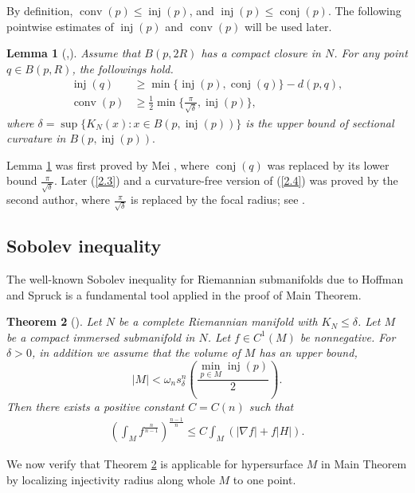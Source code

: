 \documentclass{amsart}
\numberwithin{equation}{section}
\newtheorem{theo}{Theorem}[section]
\newtheorem{lem}[theo]{Lemma}
\theoremstyle{remark}
\renewcommand{\(}{\left(}
\renewcommand{\)}{\right)}
\renewcommand{\~}{\tilde}
\renewcommand{\-}{\overline}
\renewcommand{\d}{\delta}
\newcommand{\inj}{\operatorname{inj}}
\newcommand{\conj}{\operatorname{conj}}
\newcommand{\conv}{\operatorname{conv}}
\begin{document}
By definition, $\conv(p)\le \inj(p)$, and  $\inj(p)\le \conj(p)$. The following pointwise estimates of $\inj(p)$ and $\conv(p)$ will be used later.

\begin{lem}[\cite{Xu2018},\cite{Mei2016}]\label{theo-2.2}
	Assume that $B(p,2R)$ has a compact closure in $N$. For any point $q\in B(p,R)$, the followings hold.
	\begin{align}\label{2.3}
	\inj(q)&\geq \min\{\inj(p),\conj(q)\}-d(p,q),\\
	\label{2.4}
	\conv(p)&\geq \frac{1}{2}\min\{\frac{\pi}{\sqrt{\d}},\inj(p)\},
	\end{align}
	where $\d=\sup\{K_N(x): x\in B(p,\inj(p))\}$ is the upper bound of sectional curvature in $B(p,\inj(p)).$
\end{lem}
Lemma \ref{theo-2.2} was first proved by Mei \cite{Mei2016}, where $\conj(q)$ was replaced by its lower bound $\frac{\pi}{\sqrt{\d}}$. Later (\ref{2.3}) and a curvature-free version of (\ref{2.4}) was proved by the second author, where $\frac{\pi}{\sqrt{\d}}$ is replaced by the focal radius; see \cite{Xu2018}.

\subsection{Sobolev inequality}\label{sec:2.2}
The well-known Sobolev inequality for Riemannian submanifolds due to Hoffman and Spruck \cite{Hoffman-spruck1974} is a fundamental tool applied in the proof of Main Theorem.
\begin{theo}[\cite{Hoffman-spruck1974}]\label{theo-2.1}
	Let $N$ be a complete Riemannian manifold with $K_{N}\leq \d$. Let $M$ be a compact immersed submanifold in $N$. Let $f\in C^1(M)$ be nonnegative. For $\d>0$, in addition we assume that the volume of $M$ has an upper bound,
	\begin{equation}\label{vol-inj-require}
		|M|<\omega_n s_\d^n\(\frac{\min_{p\in M}\inj(p)}{2}\).
	\end{equation}
	Then there exists a positive constant $C=C(n)$ such that
	\begin{align}\label{Hoffman-Spruck}
	\(\int_{M} f^\frac{n}{n-1} \)^\frac{n-1}{n}\leq C\int_{M}(|\nabla f|+f|H|).
	\end{align}
\end{theo}

We now verify that Theorem \ref{theo-2.1} is applicable for hypersurface $M$ in Main Theorem by
localizing injectivity radius along whole $M$ to one point.
\end{document}
